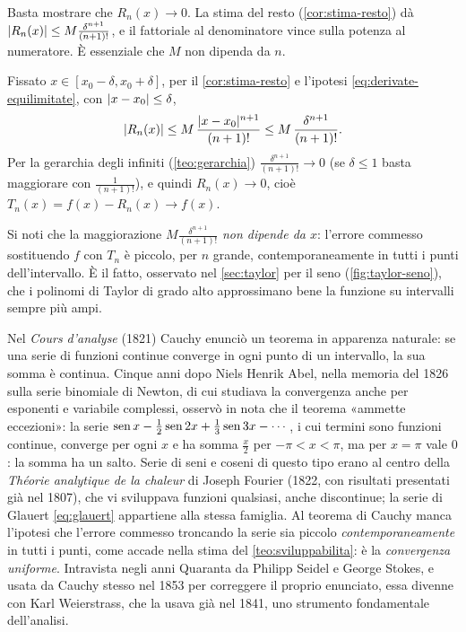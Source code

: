 \begin{schema}
\end{schema}

\begin{strategia}
Basta mostrare che $R_{n}(x)\to0$. La stima del resto (\cref{cor:stima-resto}) dà
$\lvert R_{n}(x)\rvert\le M\frac{\delta^{n+1}}{(n+1)!}$, e il fattoriale al denominatore vince sulla potenza al
numeratore. È essenziale che $M$ non dipenda da $n$.
\end{strategia}

\begin{dimostrazione}
Fissato $x\in[x_{0}-\delta,x_{0}+\delta]$, per il \cref{cor:stima-resto} e l'ipotesi
\eqref{eq:derivate-equilimitate}, con $\lvert x-x_{0}\rvert\le\delta$,
\[
  \lvert R_{n}(x)\rvert\le M\,\frac{\lvert x-x_{0}\rvert^{n+1}}{(n+1)!}\le M\,\frac{\delta^{n+1}}{(n+1)!} .
\]
Per la gerarchia degli infiniti (\cref{teo:gerarchia}) $\frac{\delta^{n+1}}{(n+1)!}\to0$ (se $\delta\le1$
basta maggiorare con $\frac1{(n+1)!}$), e quindi $R_{n}(x)\to0$, cioè $T_{n}(x)=f(x)-R_{n}(x)\to f(x)$.
\end{dimostrazione}

Si noti che la maggiorazione $M\frac{\delta^{n+1}}{(n+1)!}$ \emph{non dipende da $x$}: l'errore commesso
sostituendo $f$ con $T_{n}$ è piccolo, per $n$ grande, contemporaneamente in tutti i punti
dell'intervallo. È il fatto, osservato nel \cref{sec:taylor} per il seno
(\cref{fig:taylor-seno}), che i polinomi di Taylor di grado alto approssimano bene la
funzione su intervalli sempre più ampi.

\begin{notastorica}
Nel \emph{Cours d'analyse} (1821) Cauchy enunciò un teorema in apparenza naturale: se una
serie di funzioni continue converge in ogni punto di un intervallo, la sua somma è
continua. Cinque anni dopo Niels Henrik Abel, nella memoria del 1826 sulla serie
binomiale di Newton, di cui studiava la convergenza anche per esponenti e variabile
complessi, osservò in nota che il teorema «ammette eccezioni»: la serie
$\operatorname{sen} x-\frac12\operatorname{sen}2x+\frac13\operatorname{sen}3x-\cdots$, i cui termini sono funzioni continue, converge per ogni
$x$ e ha somma $\frac x2$ per $-\pi<x<\pi$, ma per $x=\pi$ vale $0$: la somma ha un salto. Serie di
seni e coseni di questo tipo erano al centro della \emph{Théorie analytique de la chaleur}
di Joseph Fourier (1822, con risultati presentati già nel 1807), che vi sviluppava
funzioni qualsiasi, anche discontinue; la serie di Glauert \eqref{eq:glauert} appartiene
alla stessa famiglia. Al teorema di Cauchy manca l'ipotesi che l'errore commesso
troncando la serie sia piccolo \emph{contemporaneamente} in tutti i punti, come accade
nella stima del \cref{teo:sviluppabilita}: è la \emph{convergenza uniforme}. Intravista
negli anni Quaranta da Philipp Seidel e George Stokes, e usata da Cauchy stesso nel 1853
per correggere il proprio enunciato, essa divenne con Karl Weierstrass, che la usava già
nel 1841, uno strumento fondamentale dell'analisi.
\end{notastorica}

